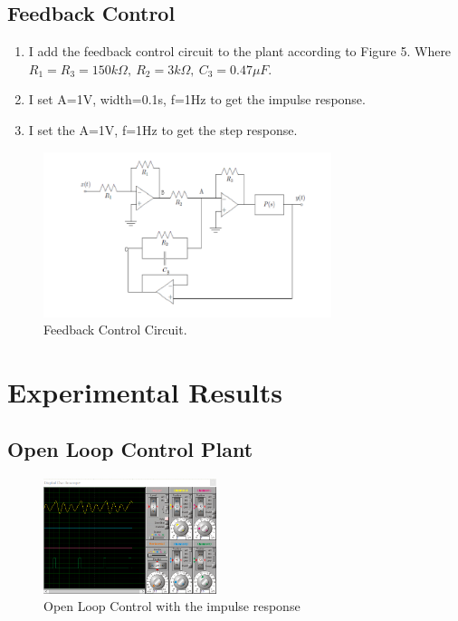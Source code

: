 \documentclass{article}
\begin{document}
{{    \subsection{Feedback Control}
    {
        \begin{enumerate}
            \item I add the feedback control circuit to the plant according to Figure 5. Where $R_{1}=R_{3}=150 k \Omega,\ R_{2}=3 k \Omega,\ C_{3}=0.47 \mu F$.
            \item I set A=1V, width=0.1s, f=1Hz to get the impulse response.
            \item I set the A=1V, f=1Hz to get the step response.
        \end{enumerate}
            
        \begin{figure}[H]
            \centering
            \includegraphics[width=0.75\textwidth]{figures/lab3_5.png}
            \caption{Feedback Control Circuit.}
            \label{fig:lab3_5}
        \end{figure}
            
    }
}

\section{Experimental Results}
{
    \subsection{Open Loop Control Plant}
    {
        \begin{figure}[H]
            \begin{small}
                \begin{center}
                    \includegraphics[width=0.45\textwidth]{figures/lab3_6.png}
                \end{center}
                \caption{Open Loop Control with the impulse response}
                \label{fig:lab3_6}
            \end{small}
        \end{figure}

}}}
\end{document}
